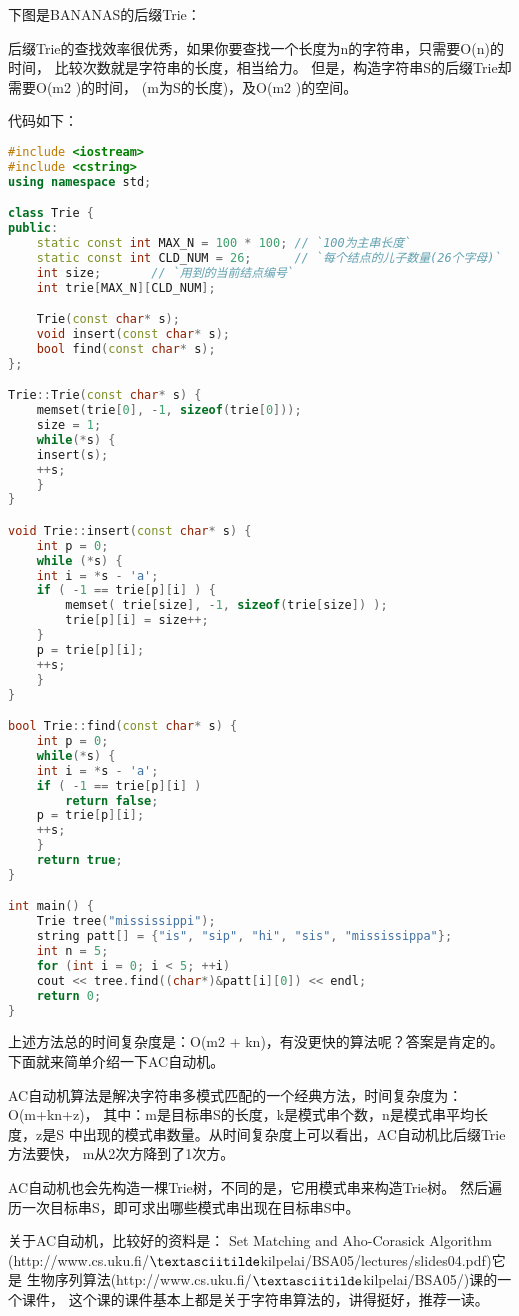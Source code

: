 \begin{description}
下图是BANANAS的后缀Trie：

后缀Trie的查找效率很优秀，如果你要查找一个长度为n的字符串，只需要O(n)的时间， 比较次数就是字符串的长度，相当给力。 但是，构造字符串S的后缀Trie却需要O(m2 )的时间， (m为S的长度)，及O(m2 )的空间。

代码如下：
\begin{lstlisting}[language=C++]
#include <iostream>
#include <cstring>
using namespace std;

class Trie {
public: 
    static const int MAX_N = 100 * 100; // `100为主串长度`
    static const int CLD_NUM = 26;      // `每个结点的儿子数量(26个字母)`
    int size;       // `用到的当前结点编号`
    int trie[MAX_N][CLD_NUM];

    Trie(const char* s);
    void insert(const char* s);
    bool find(const char* s);
};

Trie::Trie(const char* s) {
    memset(trie[0], -1, sizeof(trie[0]));
    size = 1;
    while(*s) {
	insert(s);
	++s;
    }
}

void Trie::insert(const char* s) {
    int p = 0;
    while (*s) {
	int i = *s - 'a';
	if ( -1 == trie[p][i] ) {
	    memset( trie[size], -1, sizeof(trie[size]) );
	    trie[p][i] = size++;
	}
	p = trie[p][i];
	++s;
    }
}

bool Trie::find(const char* s) {
    int p = 0;
    while(*s) {
	int i = *s - 'a';
	if ( -1 == trie[p][i] ) 
	    return false;
	p = trie[p][i];
	++s;
    }
    return true;
}

int main() {
    Trie tree("mississippi");
    string patt[] = {"is", "sip", "hi", "sis", "mississippa"};
    int n = 5;
    for (int i = 0; i < 5; ++i)
	cout << tree.find((char*)&patt[i][0]) << endl;
    return 0;
}
\end{lstlisting}
上述方法总的时间复杂度是：O(m2 + kn)，有没更快的算法呢？答案是肯定的。 下面就来简单介绍一下AC自动机。

AC自动机算法是解决字符串多模式匹配的一个经典方法，时间复杂度为：O(m+kn+z)， 其中：m是目标串S的长度，k是模式串个数，n是模式串平均长度，z是S 中出现的模式串数量。从时间复杂度上可以看出，AC自动机比后缀Trie方法要快， m从2次方降到了1次方。

AC自动机也会先构造一棵Trie树，不同的是，它用模式串来构造Trie树。 然后遍历一次目标串S，即可求出哪些模式串出现在目标串S中。

关于AC自动机，比较好的资料是： Set Matching and Aho-Corasick Algorithm (http://www.cs.uku.fi/$\textasciitilde$kilpelai/BSA05/lectures/slides04.pdf)它是 生物序列算法(http://www.cs.uku.fi/$\textasciitilde$kilpelai/BSA05/)课的一个课件， 这个课的课件基本上都是关于字符串算法的，讲得挺好，推荐一读。


\end{description}
